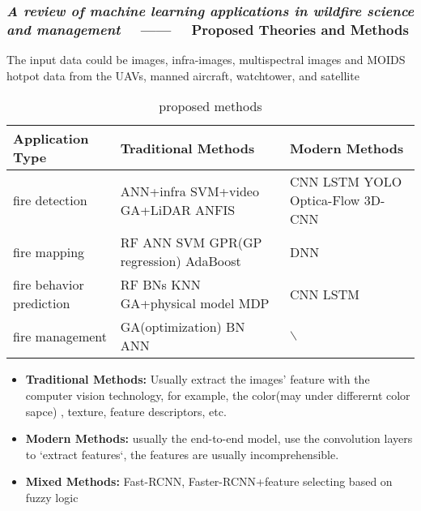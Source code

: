 \begin{frame}
    \frametitle{\textit{A review of machine learning applications in wildfire
    science and management} ~~------~~ Proposed Theories and Methods}

    The input data could be images, infra-images, multispectral images and MOIDS
    hotpot data from the UAVs, manned aircraft, watchtower, and satellite
    \begin{table}[H]
        \centering
        \begin{tabular}{p{}p{}p{}}
            \hline
            \textbf{Application Type} & Traditional Methods                    & Modern Methods  \\
            \hline
            fire detection            & ANN+infra SVM+video GA+LiDAR ANFIS     & CNN LSTM YOLO Optica-Flow 3D-CNN    \\
            fire mapping              & RF ANN SVM GPR(GP regression) AdaBoost & DNN    \\
            fire behavior prediction  & RF BNs KNN GA+physical model MDP       & CNN LSTM    \\
            fire management           & GA(optimization) BN ANN                & $\backslash$\\
            \hline
        \end{tabular}
        \caption{proposed methods}
    \end{table}
    \begin{itemize}
        \item \textbf{Traditional Methods:} Usually extract the images' feature
            with the computer vision technology, for example, the
            color(may under differernt color sapce) , texture,
            feature descriptors, etc.
        \item \textbf{Modern Methods:} usually the end-to-end model, use the
            convolution layers to `extract features`, the features are
            usually incomprehensible.
    \item \textbf{Mixed Methods:} Fast-RCNN, Faster-RCNN+feature selecting based on
            fuzzy logic
    \end{itemize}

\end{frame}
